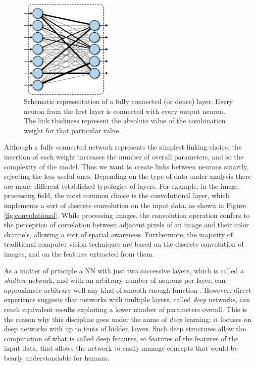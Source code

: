 \begin{figure}
    \centering
    \includegraphics[width = 0.4\textwidth]{images/fully_connected}
    \caption{Schematic representation of a fully connected (or dense) layer. Every neuron from the first layer is connected with every output neuron. The link thickness represent the absolute value of the combination weight for that particular value. }
    \label{fig:fully_connected}
\end{figure}

Although a fully connected network represents the simplest linking choice, the insertion of each weight increases the number of overall parameters, and so the complexity of the model. Thus we want to create links between neurons smartly, rejecting the less useful ones. Depending on the type of data under analysis there are many different established typologies of layers. For example, in the image processing field, the most common choice is the convolutional layer, which implements a sort of discrete convolution on the input data, as shown in Figure \ref{fig:convolutional}. While processing images, the convolution operation confers to the perception of correlation between adjacent pixels of an image and their color channels, allowing a sort of spatial awareness. Furthermore, the majority of traditional computer vision techniques are based on the discrete convolution of images, and on the features extracted from them.

As a matter of principle a NN with just two successive layers, which is called a \textit{shallow} network, and with an arbitrary number of neurons per layer, can approximate arbitrary well any kind of smooth enough function \cite{pinkus_1999}. However, direct experience suggests that networks with multiple layers, called \textit{deep} networks, can reach equivalent results exploiting a lower number of parameters overall. This is the reason why this discipline goes under the name of \textit{deep} learning: it focuses on deep networks with up to tents of hidden layers. Such deep structures allow the computation of what is called deep features, so features of the features of the input data, that allows the network to easily manage concepts that would be bearly understandable for humans.

